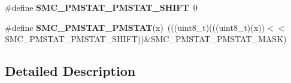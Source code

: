 \begin{DoxyCompactItemize}
\item 
\#define {\bfseries S\+M\+C\+\_\+\+P\+M\+S\+T\+A\+T\+\_\+\+P\+M\+S\+T\+A\+T\+\_\+\+S\+H\+I\+FT}~0\hypertarget{group__SMC__Register__Masks_gaa4083ab43677e6a1b6832f6607a5ef0e}{}\label{group__SMC__Register__Masks_gaa4083ab43677e6a1b6832f6607a5ef0e}

\item 
\#define {\bfseries S\+M\+C\+\_\+\+P\+M\+S\+T\+A\+T\+\_\+\+P\+M\+S\+T\+AT}(x)~(((uint8\+\_\+t)(((uint8\+\_\+t)(x))$<$$<$S\+M\+C\+\_\+\+P\+M\+S\+T\+A\+T\+\_\+\+P\+M\+S\+T\+A\+T\+\_\+\+S\+H\+I\+FT))\&S\+M\+C\+\_\+\+P\+M\+S\+T\+A\+T\+\_\+\+P\+M\+S\+T\+A\+T\+\_\+\+M\+A\+SK)\hypertarget{group__SMC__Register__Masks_ga27d1d3c05772950ce55e5ad4d2a998e3}{}\label{group__SMC__Register__Masks_ga27d1d3c05772950ce55e5ad4d2a998e3}

\end{DoxyCompactItemize}


\subsection{Detailed Description}
